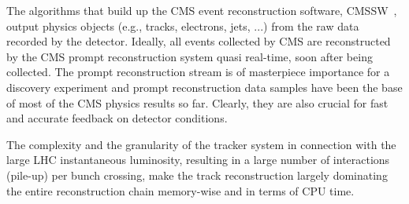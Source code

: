 The algorithms that build up the CMS event reconstruction software, CMSSW~\cite{cmssw},
output physics objects (e.g., tracks, electrons, jets, ...) from the
raw data recorded by the detector. Ideally, all events collected by CMS are
reconstructed by the CMS prompt reconstruction system quasi real-time, soon after being
collected. The prompt reconstruction stream is of masterpiece
importance for a discovery experiment and prompt reconstruction data
samples have been the base of most of the CMS physics results so
far. Clearly, they are also crucial for fast and accurate feedback on detector
conditions.

The complexity and the granularity of the tracker system in
connection with the large LHC instantaneous luminosity, resulting in a
large number of interactions (pile-up) per bunch crossing, make the
track reconstruction largely dominating the entire reconstruction
chain memory-wise and in terms of CPU time.


